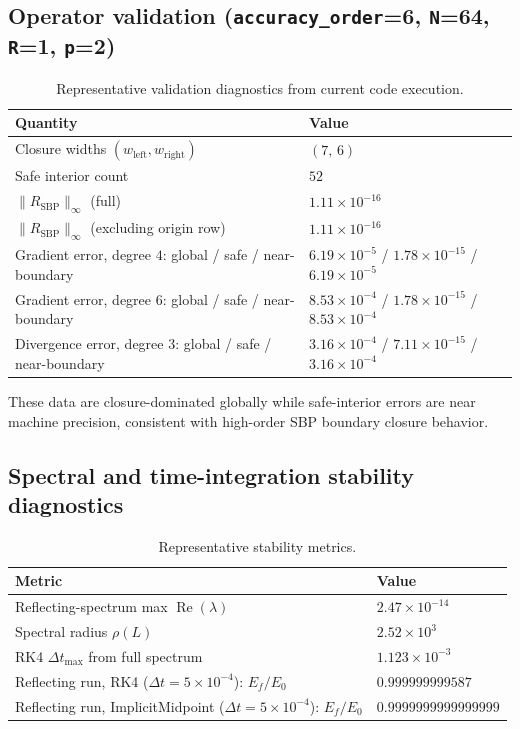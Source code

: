 \documentclass[
  aps,
  pre,
  reprint,
  superscriptaddress,
  nofootinbib
]{revtex4-2}
\newcommand{\Rsbp}{R_{\mathrm{SBP}}}
\begin{document}
\subsection{Operator validation (\texttt{accuracy\_order}=6, \texttt{N}=64, \texttt{R}=1, \texttt{p}=2)}
\begin{table}[t]
\centering
\caption{Representative validation diagnostics from current code execution.}
\begin{tabular}{@{}ll@{}}
\toprule
Quantity & Value \\
\midrule
Closure widths $(w_{\mathrm{left}}, w_{\mathrm{right}})$ & $(7,\,6)$ \\
Safe interior count & $52$ \\
$\|\Rsbp\|_{\infty}$ (full) & $1.11\times10^{-16}$ \\
$\|\Rsbp\|_{\infty}$ (excluding origin row) & $1.11\times10^{-16}$ \\
\midrule
Gradient error, degree $4$: global / safe / near-boundary &
$6.19\times10^{-5}$ / $1.78\times10^{-15}$ / $6.19\times10^{-5}$ \\
Gradient error, degree $6$: global / safe / near-boundary &
$8.53\times10^{-4}$ / $1.78\times10^{-15}$ / $8.53\times10^{-4}$ \\
Divergence error, degree $3$: global / safe / near-boundary &
$3.16\times10^{-4}$ / $7.11\times10^{-15}$ / $3.16\times10^{-4}$ \\
\bottomrule
\end{tabular}
\end{table}

These data are closure-dominated globally while safe-interior errors are near machine
precision, consistent with high-order SBP boundary closure behavior.

\subsection{Spectral and time-integration stability diagnostics}
\begin{table}[b]
\centering
\caption{Representative stability metrics.}
\begin{tabular}{@{}ll@{}}
\toprule
Metric & Value \\
\midrule
Reflecting-spectrum max $\operatorname{Re}(\lambda)$ & $2.47\times10^{-14}$ \\
Spectral radius $\rho(L)$ & $2.52\times10^{3}$ \\
RK4 $\Delta t_{\max}$ from full spectrum & $1.123\times10^{-3}$ \\
\midrule
Reflecting run, RK4 ($\Delta t=5\times10^{-4}$): $E_f/E_0$ & $0.999999999587$ \\
Reflecting run, ImplicitMidpoint ($\Delta t=5\times10^{-4}$): $E_f/E_0$ & $0.9999999999999999$ \\
\bottomrule
\end{tabular}
\end{table}
\end{document}
